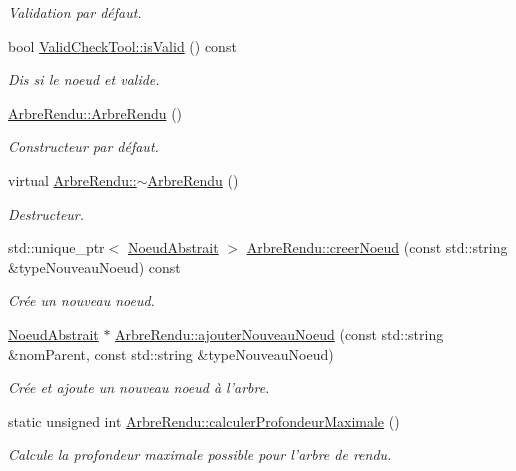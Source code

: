 \begin{DoxyCompactItemize}
\begin{DoxyCompactList}\small\item\em Validation par défaut. \end{DoxyCompactList}\item 
bool \hyperlink{group__inf2990_ga8917a37ee52e2661d510c79a43a4032d}{Valid\-Check\-Tool\-::is\-Valid} () const 
\begin{DoxyCompactList}\small\item\em Dis si le noeud et valide. \end{DoxyCompactList}\item 
\hyperlink{group__inf2990_gaef1e98a66c4f1d3b468c786edee45ae6}{Arbre\-Rendu\-::\-Arbre\-Rendu} ()
\begin{DoxyCompactList}\small\item\em Constructeur par défaut. \end{DoxyCompactList}\item 
virtual \hyperlink{group__inf2990_gadb462923759da0ff632dad097b7bfdab}{Arbre\-Rendu\-::$\sim$\-Arbre\-Rendu} ()
\begin{DoxyCompactList}\small\item\em Destructeur. \end{DoxyCompactList}\item 
std\-::unique\-\_\-ptr$<$ \hyperlink{class_noeud_abstrait}{Noeud\-Abstrait} $>$ \hyperlink{group__inf2990_gaead1f3ae9de5de53e31ad9e886ba259c}{Arbre\-Rendu\-::creer\-Noeud} (const std\-::string \&type\-Nouveau\-Noeud) const 
\begin{DoxyCompactList}\small\item\em Crée un nouveau noeud. \end{DoxyCompactList}\item 
\hyperlink{class_noeud_abstrait}{Noeud\-Abstrait} $\ast$ \hyperlink{group__inf2990_gac10e5f0623af502d67f72aef764206a3}{Arbre\-Rendu\-::ajouter\-Nouveau\-Noeud} (const std\-::string \&nom\-Parent, const std\-::string \&type\-Nouveau\-Noeud)
\begin{DoxyCompactList}\small\item\em Crée et ajoute un nouveau noeud à l'arbre. \end{DoxyCompactList}\item 
static unsigned int \hyperlink{group__inf2990_gacf0e53d52040b07cd6550fda79867bd5}{Arbre\-Rendu\-::calculer\-Profondeur\-Maximale} ()
\begin{DoxyCompactList}\small\item\em Calcule la profondeur maximale possible pour l'arbre de rendu. \end{DoxyCompactList}\item 

\end{DoxyCompactItemize}
